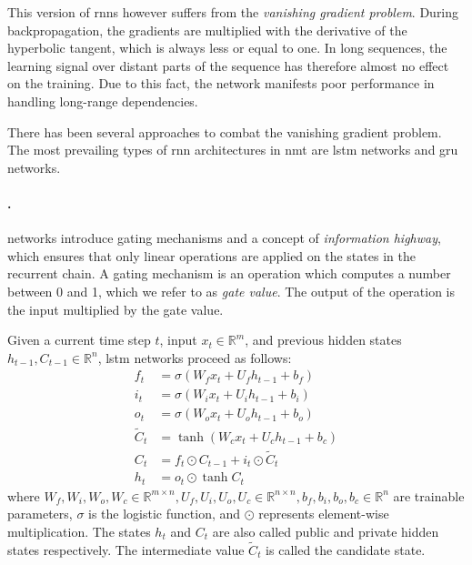 This version of \glspl{rnn} however suffers from the \emph{vanishing gradient
problem}. During backpropagation, the gradients are multiplied with the
derivative of the hyperbolic tangent, which is always less or equal to one. In
long sequences, the learning signal over distant parts of the sequence has
therefore almost no effect on the training. Due to this fact, the network
manifests poor performance in handling long-range dependencies.

There has been several approaches to combat the vanishing gradient problem.  The
most prevailing types of \gls{rnn} architectures in \gls{nmt} are \gls{lstm}
networks and \gls{gru} networks.

\paragraph{.}  networks
\citep{hochreiter1997long} introduce gating mechanisms and a concept of
\emph{information highway}, which ensures that only linear operations are
applied on the states in the recurrent chain. A gating mechanism is an
operation which computes a number between 0 and 1, which we refer to as
\emph{gate value}.  The output of the operation is the input multiplied by the
gate value.

Given a current time step $t$, input $x_t \in \mathbb{R}^m$, and previous hidden
states $h_{t-1}, C_{t-1} \in \mathbb{R}^n$, \gls{lstm} networks proceed as
follows:
%
\begin{align}
  f_t &= \sigma\left(W_f x_t + U_f h_{t-1} + b_f\right) \label{eq:lstm-forget-gate} \\
  i_t &= \sigma\left(W_i x_t + U_i h_{t-1} + b_i\right) \label{eq:lstm-input-gate} \\
  o_t &= \sigma\left(W_o x_t + U_o h_{t-1} + b_o\right) \label{eq:lstm-output-gate} \\
  \tilde{C}_t &= \tanh \left( W_c x_t + U_c h_{t-1} + b_c \right) \label{eq:lstm-candidate} \\
  C_t &= f_t \odot C_{t-1} + i_t \odot \tilde{C}_t \label{eq:lstm-information-highway} \\
  h_t &= o_t \odot \tanh C_t \label{eq:lstm-hidden-state}
\end{align}
%
where $W_f, W_i, W_o, W_c \in \mathbb{R}^{m \times n}, U_f, U_i, U_o, U_c \in
\mathbb{R}^{n \times n}, b_f, b_i, b_o, b_c \in \mathbb{R}^n$ are trainable
parameters, $\sigma$ is the logistic function, and $\odot$ represents
element-wise multiplication. The states $h_t$ and $C_t$ are also called public
and private hidden states respectively. The intermediate value $\tilde{C}_t$ is
called the candidate state.

